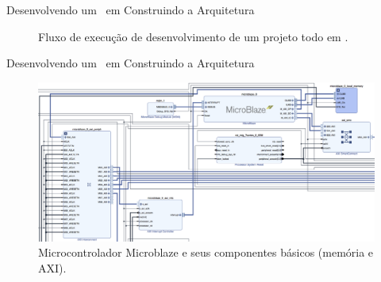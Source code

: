 

\begin{frame}[fragile]{Desenvolvendo um \Wearable\ em \Software }{Construindo a Arquitetura}
\begin{figure}
    \caption{Fluxo de execução de desenvolvimento de um projeto todo em \software.}
\end{figure}
\end{frame}


\begin{frame}{Desenvolvendo um \Wearable\ em \Software }{Construindo a Arquitetura}
\vspace{-0.8em}
\begin{figure}[h] \centering
    \includegraphics[width=1\textwidth]{img/vivado_software/1-microblaze-axi.png}
    \caption{Microcontrolador Microblaze e seus componentes básicos (memória e AXI).}
\end{figure}
\end{frame}

